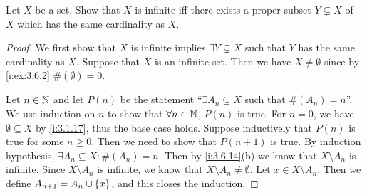 \exercisesection

\begin{ex}\label{i:ex:8.1.1}
  Let \(X\) be a set.
  Show that \(X\) is infinite iff there exists a proper subset \(Y \subsetneq X\) of \(X\) which has the same cardinality as \(X\).
\end{ex}

\begin{proof}
  We first show that \(X\) is infinite implies \(\exists Y \subsetneq X\) such that \(Y\) has the same cardinality as \(X\).
  Suppose that \(X\) is an infinite set.
  Then we have \(X \neq \emptyset\) since by \cref{i:ex:3.6.2} \(\#(\emptyset) = 0\).

  Let \(n \in \mathbb{N}\) and let \(P(n)\) be the statement ``\(\exists A_n \subseteq X\) such that \(\#(A_n) = n\)''.
  We use induction on \(n\) to show that \(\forall n \in \mathbb{N}\), \(P(n)\) is true.
  For \(n = 0\), we have \(\emptyset \subseteq X\) by \cref{i:3.1.17}, thus the base case holds.
  Suppose inductively that \(P(n)\) is true for some \(n \geq 0\).
  Then we need to show that \(P(n + 1)\) is true.
  By induction hypothesis, \(\exists A_n \subseteq X : \#(A_n) = n\).
  Then by \cref{i:3.6.14}(b) we know that \(X \setminus A_n\) is infinite.
  Since \(X \setminus A_n\) is infinite, we know that \(X \setminus A_n \neq \emptyset\).
  Let \(x \in X \setminus A_n\).
  Then we define \(A_{n + 1} = A_n \cup \left\lbrace x\right\rbrace\), and this closes the induction.


\end{proof}
